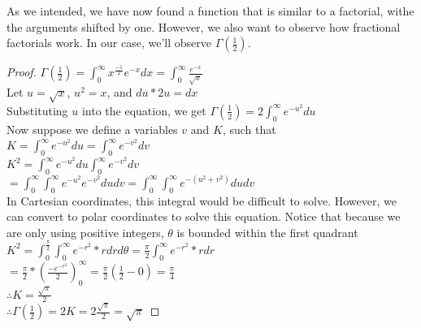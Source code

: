 As we intended, we have now found a function that is similar to a factorial, withe the arguments shifted by one. However, we also want to observe how fractional factorials work. In our case, we'll observe $\Gamma(\frac{1}{2})$. 
\begin{proof}
$\Gamma(\frac{1}{2})=\int_{0}^{\infty}{x^{\frac{-1}{2}}e^{-x}}dx = \int_{0}^{\infty}{\frac{e^{-x}}{\sqrt{x}}}$\\
Let $u=\sqrt{x}$, $u^2=x$, and $du*2u=dx$\\
Substituting $u$ into the equation, we get $\Gamma(\frac{1}{2})=2\int_{0}^{\infty}{e^{-u^2}}du$\\
Now suppose we define a variables $v$ and $K$, such that\\
$K=\int_{0}^{\infty}{e^{-u^2}}du = \int_{0}^{\infty}{e^{-v^2}}dv$\\
$K^2=\int_{0}^{\infty}{e^{-u^2}}du \int_{0}^{\infty}{e^{-v^2}}dv$\\
$=\int_{0}^{\infty}\int_{0}^{\infty}{e^{-u^2}e^{-v^2}}dudv = \int_{0}^{\infty}\int_{0}^{\infty}{e^{-(u^2+v^2)}}dudv$\\
In Cartesian coordinates, this integral would be difficult to solve. However, we can convert to polar coordinates to solve this equation. Notice that because we are only using positive integers, $\theta$ is bounded within the first quadrant\\
$K^2=\int_{0}^{\frac{\pi}{2}}\int_{0}^{\infty}{e^{-r^2}*r}drd\theta = \frac{\pi}{2}\int_{0}^{\infty}{e^{-r^2}*r}dr$\\
$=\frac{\pi}{2}*(\frac{-e^{-r^2}}{2})_{0}^{\infty} = \frac{\pi}{2}(\frac{1}{2} - 0) = \frac{\pi}{4}$\\
$\therefore K = \frac{\sqrt{\pi}}{2}$\\
$\therefore \Gamma(\frac{1}{2}) = 2K = 2\frac{\sqrt{\pi}}{2} = \sqrt{\pi}$
\end{proof}
% 
